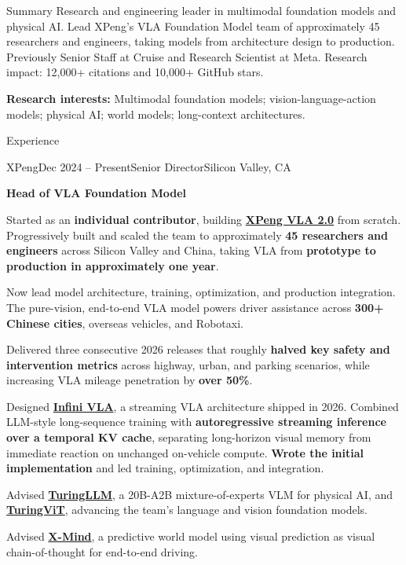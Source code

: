 \documentclass{resume}
\begin{document}
\begin{rSection}{Summary}
Research and engineering leader in multimodal foundation models and physical AI. Lead XPeng's VLA Foundation Model team of approximately 45 researchers and engineers, taking models from architecture design to production. Previously Senior Staff at Cruise and Research Scientist at Meta. Research impact: 12,000+ citations and 10,000+ GitHub stars.

\textbf{Research interests:} Multimodal foundation models; vision-language-action models; physical AI; world models; long-context architectures.
\end{rSection}

\begin{rSection}{Experience}
\begin{rSubsection}{XPeng}{Dec 2024 -- Present}{Senior Director}{Silicon Valley, CA}
\item[] \textbf{Head of VLA Foundation Model}
\item Started as an \textbf{individual contributor}, building \href{https://www.xpeng.com/pressroom/news/019cae5e67b99c0960ee8a028129016a}{\textbf{XPeng VLA 2.0}} from scratch. Progressively built and scaled the team to approximately \textbf{45 researchers and engineers} across Silicon Valley and China, taking VLA from \textbf{prototype to production in approximately one year}.
\item Now lead model architecture, training, optimization, and production integration. The pure-vision, end-to-end VLA model powers driver assistance across \textbf{300+ Chinese cities}, overseas vehicles, and Robotaxi.
\item Delivered three consecutive 2026 releases that roughly \textbf{halved key safety and intervention metrics} across highway, urban, and parking scenarios, while increasing VLA mileage penetration by \textbf{over 50\%}.
\item Designed \href{https://pandaily.com/xpeng-second-gen-vla-time}{\textbf{Infini VLA}}, a streaming VLA architecture shipped in 2026. Combined LLM-style long-sequence training with \textbf{autoregressive streaming inference over a temporal KV cache}, separating long-horizon visual memory from immediate reaction on unchanged on-vehicle compute. \textbf{Wrote the initial implementation} and led training, optimization, and integration.
\item Advised \href{https://arxiv.org/abs/2608.30567}{\textbf{TuringLLM}}, a 20B-A2B mixture-of-experts VLM for physical AI, and \href{https://arxiv.org/abs/2606.24253}{\textbf{TuringViT}}, advancing the team's language and vision foundation models.
\item Advised \href{https://arxiv.org/abs/2606.28758}{\textbf{X-Mind}}, a predictive world model using visual prediction as visual chain-of-thought for end-to-end driving.
\end{rSubsection}


\end{rSection}
\end{document}
